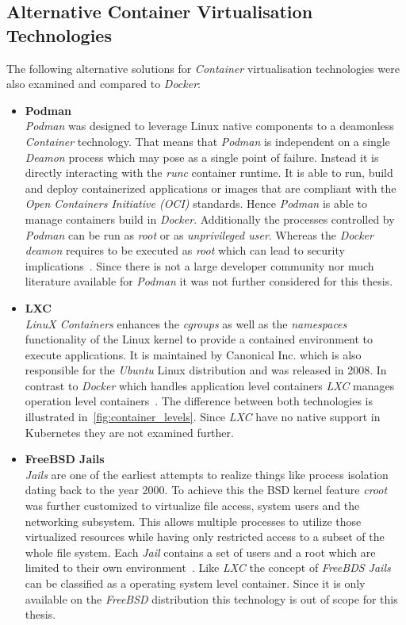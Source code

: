 \subsection{Alternative Container Virtualisation Technologies}
The following alternative solutions for \textit{Container} virtualisation technologies were also examined and compared to \textit{Docker}:
\begin{itemize}
    \item[]{\textbf{Podman}\\
    \textit{Podman} was designed to leverage Linux native components to a deamonless \textit{Container} technology.
    That means that \textit{Podman} is independent on a single \textit{Deamon} process which may pose as a single point of failure.
    Instead it is directly interacting with the \textit{runc} container runtime.
    It is able to run, build and deploy containerized applications or images that are compliant with the \textit{Open Containers Initiative (OCI)} standards.
    Hence \textit{Podman} is able to manage containers build in \textit{Docker}.
    Additionally the processes controlled by \textit{Podman} can be run as \textit{root} or as \textit{unprivileged user}.
    Whereas the \textit{Docker deamon} requires to be executed as \textit{root} which can lead to security implications~\cite{podman}.
    Since there is not a large developer community nor much literature available for \textit{Podman} it was not further considered for this thesis.
    }
    \item[]{\textbf{LXC}\\
    \textit{LinuX Containers} enhances the \textit{cgroups} as well as the \textit{namespaces} functionality of the Linux kernel to provide a contained environment to execute applications.
    It is maintained by Canonical Inc. which is also responsible for the \textit{Ubuntu} Linux distribution and was released in 2008.
    In contrast to \textit{Docker} which handles application level containers \textit{LXC} manages operation level containers~\cite{lxc, docker1}.
    The difference between both technologies is illustrated in~\cref{fig:container_levels}.
    Since \textit{LXC} have no native support in Kubernetes they are not examined further.
    }
    \item[]{\textbf{FreeBSD Jails}\\
    \textit{Jails} are one of the earliest attempts to realize things like process isolation dating back to the year 2000.
    To achieve this the BSD kernel feature \textit{croot} was further customized to virtualize file access, system users and the networking subsystem.
    This allows multiple processes to utilize those virtualized resources while having only restricted access to a subset of the whole file system.
    Each \textit{Jail} contains a set of users and a root which are limited to their own environment~\cite{jails}.
    Like \textit{LXC} the concept of \textit{FreeBDS Jails} can be classified as a operating system level container.
    Since it is only available on the \textit{FreeBSD} distribution this technology is out of scope for this thesis.
    }
\end{itemize}
